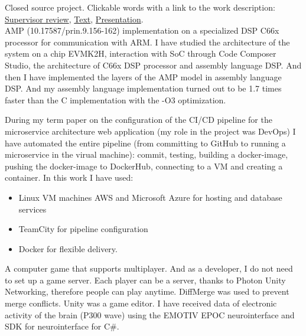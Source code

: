 \documentclass[
	a4paper,
]{fortysecondscv}
\begin{document}
\begin{cvtable}[1.5]
	{Closed source project. Clickable words with a link to the work description: \href{https://dspace.spbu.ru/bitstream/11701/32361/2/reviewSV_Afanasov_review.pdf}{Supervisor review}, \href{https://dspace.spbu.ru/bitstream/11701/32361/1/Afanasov_report.pdf}{Text}, \href{https://se.math.spbu.ru/thesis/slides/Afanasov_Artem_Konstantinovich_Bachelor_Thesis_2021_slides.pdf}{Presentation}.}
	{\\ AMP (10.17587/prin.9.156-162) implementation on a specialized DSP C66x processor for communication with ARM. I have studied the architecture of the system on a chip \colorbox{cvsidecolor}{EVMK2H}, interaction with SoC through \colorbox{cvsidecolor}{Code Composer Studio}, the architecture of \colorbox{cvsidecolor}{C66x DSP} processor and \colorbox{cvsidecolor}{assembly language DSP}. And then I have implemented the layers of the AMP model in assembly language DSP. And my assembly language implementation turned out to be 1.7 times faster than the C implementation with the -O3 optimization.}
	{During my term paper on the configuration of the \colorbox{cvsidecolor}{CI/CD} pipeline for the microservice architecture web application (my role in the project was DevOps) I have automated the entire pipeline (from committing to GitHub to running a microservice in the virual machine): commit, testing, building a docker-image, pushing the docker-image to DockerHub, connecting to a VM and creating a container. In this work I have used:
    \begin{itemize}
    \item \colorbox{cvsidecolor}{Linux VM machines} \colorbox{cvsidecolor}{AWS} and \colorbox{cvsidecolor}{Microsoft Azure} for hosting and database services
    \item \colorbox{cvsidecolor}{TeamCity} for pipeline configuration
    \item \colorbox{cvsidecolor}{Docker} for flexible delivery.
    \end{itemize}}
	{A computer game that supports multiplayer. And as a developer, I do not need to set up a game server. Each player can be a server, thanks to \colorbox{cvsidecolor}{Photon Unity Networking}, therefore people can play anytime. \colorbox{cvsidecolor}{DiffMerge} was used to prevent merge conflicts. \colorbox{cvsidecolor}{Unity} was a game editor.}
	{I have received data of electronic activity of the brain (P300 wave) using \colorbox{cvsidecolor}{the EMOTIV EPOC neurointerface} and \colorbox{cvsidecolor}{SDK for neurointerface} for \colorbox{cvsidecolor}{C\#}.}
\end{cvtable}

\cvsignature
\end{document}
